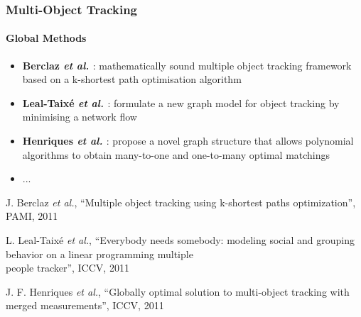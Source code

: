 \begin{frame}
	\frametitle{Multi-Object Tracking}
	\framesubtitle{Global Methods}
	
	\Large
	
	\vspace{0.05cm}
	
	\begin{itemize}
		\item \textbf{Berclaz \emph{et al.} \cite{Berclaz11}}: mathematically sound multiple object
			  tracking framework based on a k-shortest path optimisation algorithm
		\item \textbf{Leal-Taix{\'e} \emph{et al.} \cite{Leal11}}: formulate a new graph model for
			  object tracking by minimising a network flow
		\item \textbf{Henriques \emph{et al.} \cite{Henriques11}}: propose a novel graph structure
			  that allows polynomial algorithms to obtain many-to-one and one-to-many optimal matchings
		\item ...
	\end{itemize}
	
	\vspace{0.15cm}
	
	\tiny
	
	\cite{Berclaz11} J. Berclaz \emph{et al.}, ``Multiple object tracking using k-shortest paths
	optimization'', PAMI, 2011
	
	\vspace{0.05cm}
	
	\cite{Leal11} L. Leal-Taix{\'e} \emph{et al.}, ``Everybody needs somebody: modeling social and
	grouping behavior on a linear programming multiple\\ \hspace{0.25cm} people tracker'', ICCV, 2011
	
	\vspace{-0.19cm}
	
	\cite{Henriques11} J. F. Henriques \emph{et al.}, ``Globally optimal solution to multi-object
	tracking with merged measurements'', ICCV, 2011
\end{frame}

